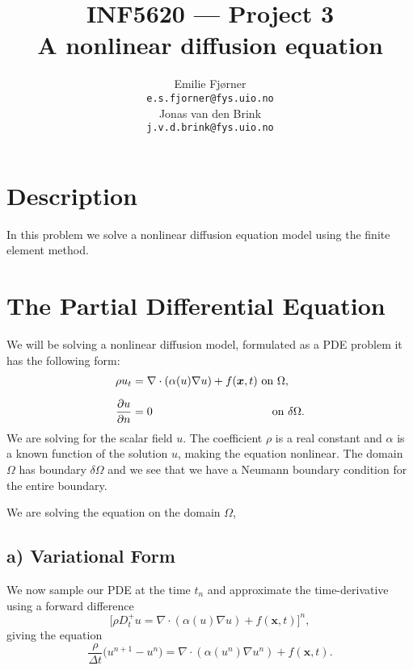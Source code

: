 \documentclass[a4paper, 11pt, notitlepage, english]{article}
\author{Emilie Fjørner \\[-0.4cm] \texttt{e.s.fjorner@fys.uio.no} \\[0.2cm] Jonas van den Brink \\[-0.4cm] \texttt{j.v.d.brink@fys.uio.no}}
\title{INF5620 --- Project 3 \\ A nonlinear diffusion equation}
\newcommand{\bt}[1]{\boldsymbol{#1}}
\newcommand{\p}{\partial}
\begin{document}
\maketitle

\vspace{1cm}

\section*{Description}

In this problem we solve a nonlinear diffusion equation model using the finite element method.

\clearpage

\section*{The Partial Differential Equation}

We will be solving a nonlinear diffusion model, formulated as a PDE problem it has the following form:
\begin{align} 
\rho u_t &= \nabla \cdot (\alpha(u)\nabla u) + f(\bt{x},t) \mbox{ on } \Omega, \\[0.2cm]
\frac{\p u}{\p n} &= 0 \hspace{3.6cm} \mbox{ on } \delta \Omega.
\end{align}
We are solving for the scalar field $u$. The coefficient $\rho$ is a real constant and $\alpha$ is a known function of the solution $u$, making the equation nonlinear. The domain $\Omega$ has boundary $\delta\Omega$ and we see that we have a Neumann boundary condition for the entire boundary.

We are solving the equation on the domain $\Omega$, 

\subsection*{a) Variational Form}
We now sample our PDE at the time $t_n$ and approximate the time-derivative using a forward difference
$$\bigg[\rho D^+_t u = \nabla \cdot (\alpha(u)\nabla u) + f(\bt{x},t)\bigg]^n,$$
giving the equation
$$\frac{\rho}{\Delta t}\big(u^{n+1} - u^n\big) = \nabla \cdot (\alpha(u^n)\nabla u^n) + f(\bt{x},t).$$
\end{document}
